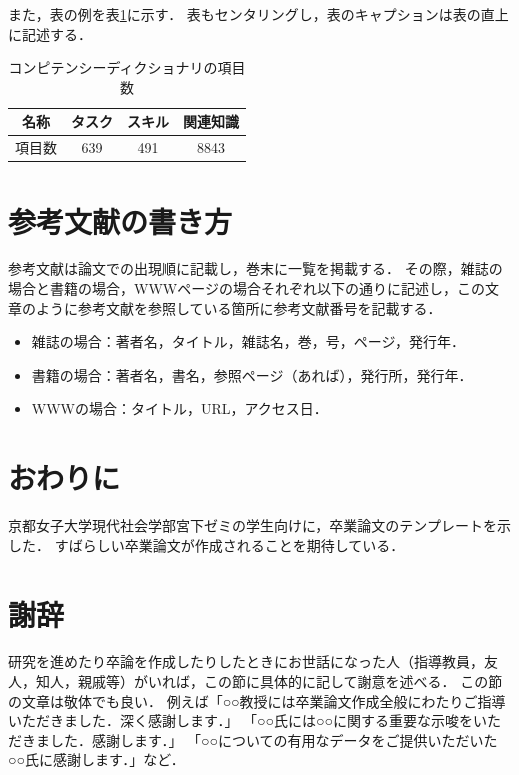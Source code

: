 \documentclass[a4paper,twocolumn,10pt]{ltjsarticle}
\begin{document}
また，表の例を表\ref{tab:competency}に示す．
表もセンタリングし，表のキャプションは表の直上に記述する．

\begin{table}[htb]
 \begin{center}
  \caption{コンピテンシーディクショナリの項目数}
  \label{tab:competency}
  \begin{tabular}{cccc}
   \hline
   名称 & タスク & スキル & 関連知識\\
   \hline
   項目数 & 639 & 491 & 8843\\
   \hline
  \end{tabular}
 \end{center}
\end{table}

\section{参考文献の書き方}

参考文献は論文での出現順に記載し，巻末に一覧を掲載する．
その際，雑誌の場合\cite{refjournal1,refjournal2}と書籍の場合\cite{refbook1,refbook2}，WWWページの場合\cite{refwww}それぞれ以下の通りに記述し，この文章のように参考文献を参照している箇所に参考文献番号を記載する．

\begin{itemize}
 \item 雑誌の場合：著者名，タイトル，雑誌名，巻，号，ページ，発行年．
 \item 書籍の場合：著者名，書名，参照ページ（あれば），発行所，発行年．
 \item WWWの場合：タイトル，URL，アクセス日．
\end{itemize}

\section{おわりに}

京都女子大学現代社会学部宮下ゼミの学生向けに，卒業論文のテンプレートを示した．
すばらしい卒業論文が作成されることを期待している．

\section*{謝辞}

研究を進めたり卒論を作成したりしたときにお世話になった人（指導教員，友人，知人，親戚等）がいれば，この節に具体的に記して謝意を述べる．
この節の文章は敬体でも良い．
例えば「○○教授には卒業論文作成全般にわたりご指導いただきました．深く感謝します．」
「○○氏には○○に関する重要な示唆をいただきました．感謝します．」
「○○についての有用なデータをご提供いただいた○○氏に感謝します．」など．
\end{document}
